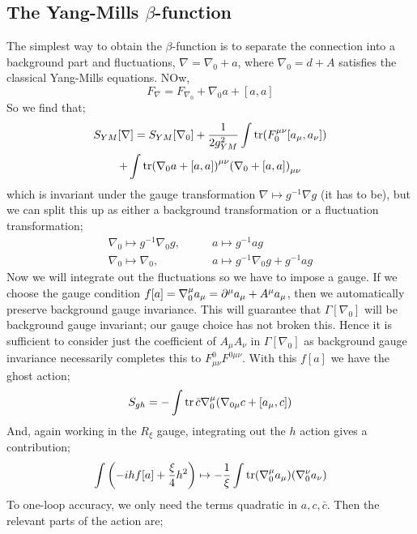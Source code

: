 \subsection{The Yang-Mills $\beta$-function}
The simplest way to obtain the $\beta$-function is to separate the connection into a background part and fluctuations, $\nabla = \nabla_0 + a$, where $\nabla_0 = d + A$ satisfies the classical Yang-Mills equations. NOw,
\begin{equation*}
F_{\nabla} = F_{\nabla_0} + \nabla_0 a + [a,a]
\end{equation*}
So we find that;
\begin{multline*}
S_{YM}[\nabla] = S_{YM}[\nabla_0] + \frac{1}{2g^2_{YM}}\int{\tr\left(F_0^{\mu\nu}[a_\mu, a_\nu]\right)} \\ + \int{\tr\left(\nabla_0 a + [a, a]\right)^{\mu\nu}\left(\nabla_0 + [a,a]\right)_{\mu\nu}}
\end{multline*}
which is invariant under the gauge transformation $\nabla \mapsto g^{-1}\nabla g$ (it has to be), but we can split this up as either a background transformation or a fluctuation transformation;
\begin{align}
\nabla_0 \mapsto g^{-1}\nabla_0 g , &\qquad a \mapsto g^{-1}a g \\
\nabla_0 \mapsto \nabla_0, &\qquad a \mapsto g^{-1}\nabla_0 g + g^{-1}ag
\end{align}
Now we will integrate out the fluctuations so we have to impose a gauge. If we choose the gauge condition $f[a] = \nabla_0^\mu a_\mu = \partial^{\mu}a_\mu + A^\mu a_\mu$, then we automatically preserve background gauge invariance. This will guarantee that $\Gamma[\nabla_0]$ will be background gauge invariant; our gauge choice has not broken this. Hence it is sufficient to consider just the coefficient of $A_\mu A_\nu$ in $\Gamma[\nabla_0]$ as background gauge invariance necessarily completes this to $F_{\mu\nu}^{0}F^{0\mu\nu}$. With this $f[a]$ we have the ghost action;
\begin{equation*}
S_{gh} = - \int{\tr \bar{c} \nabla_0^{\mu}\left(\nabla_{0 \mu}c + [a_\mu, c]\right)}
\end{equation*}
And, again working in the $R_\xi$ gauge, integrating out the $h$ action gives a contribution;
\begin{equation*}
\int{\left(-ihf[a] + \frac{\xi}{4}h^2\right)} \mapsto -\frac{1}{\xi}\int{\tr(\nabla_0^{\mu}a_\mu)(\nabla_0^{\nu}a_\nu)}
\end{equation*}
To one-loop accuracy, we only need the terms quadratic in $a, c, \bar{c}$. Then the relevant parts of the action are;
